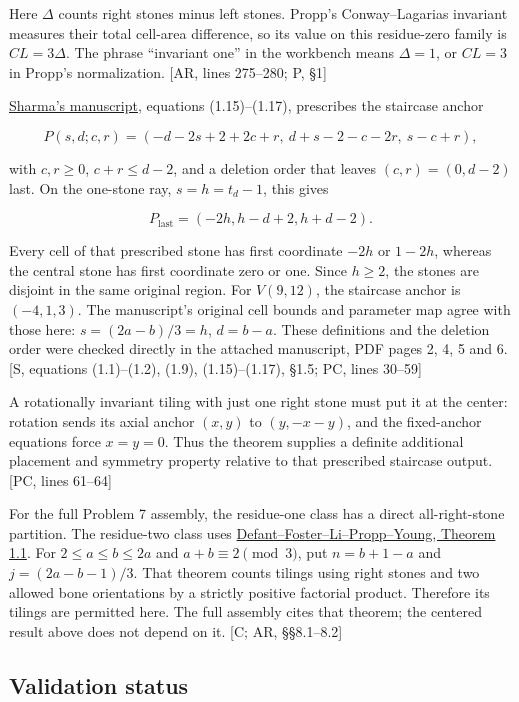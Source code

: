 \documentclass[
  11pt,
]{article}
\begin{document}
Here \(\Delta\) counts right stones minus left stones. Propp's
Conway--Lagarias invariant measures their total cell-area difference, so
its value on this residue-zero family is \(CL=3\Delta\). The phrase
``invariant one'' in the workbench means \(\Delta=1\), or \(CL=3\) in
Propp's normalization. {[}AR, lines 275--280; P, §1{]}

\href{https://mathdb.com/api/solution-artifacts/35a67ccb-6716-4906-99fe-54ea1784365b/media}{Sharma's
manuscript}, equations (1.15)--(1.17), prescribes the staircase anchor

\[
P(s,d;c,r)=(-d-2s+2+2c+r,\ d+s-2-c-2r,\ s-c+r),
\]

with \(c,r\ge0\), \(c+r\le d-2\), and a deletion order that leaves
\((c,r)=(0,d-2)\) last. On the one-stone ray, \(s=h=t_d-1\), this gives

\[
P_{\mathrm{last}}=(-2h,h-d+2,h+d-2).
\]

Every cell of that prescribed stone has first coordinate \(-2h\) or
\(1-2h\), whereas the central stone has first coordinate zero or one.
Since \(h\ge2\), the stones are disjoint in the same original region.
For \(V(9,12)\), the staircase anchor is \((-4,1,3)\). The manuscript's
original cell bounds and parameter map agree with those here:
\(s=(2a-b)/3=h\), \(d=b-a\). These definitions and the deletion order
were checked directly in the attached manuscript, PDF pages 2, 4, 5 and
6. {[}S, equations (1.1)--(1.2), (1.9), (1.15)--(1.17), §1.5; PC, lines
30--59{]}

A rotationally invariant tiling with just one right stone must put it at
the center: rotation sends its axial anchor \((x,y)\) to \((y,-x-y)\),
and the fixed-anchor equations force \(x=y=0\). Thus the theorem
supplies a definite additional placement and symmetry property relative
to that prescribed staircase output. {[}PC, lines 61--64{]}

For the full Problem 7 assembly, the residue-one class has a direct
all-right-stone partition. The residue-two class uses
\href{https://arxiv.org/html/2403.07663v1}{Defant--Foster--Li--Propp--Young,
Theorem 1.1}. For \(2\le a\le b\le2a\) and \(a+b\equiv2\pmod3\), put
\(n=b+1-a\) and \(j=(2a-b-1)/3\). That theorem counts tilings using
right stones and two allowed bone orientations by a strictly positive
factorial product. Therefore its tilings are permitted here. The full
assembly cites that theorem; the centered result above does not depend
on it. {[}C; AR, §§8.1--8.2{]}

\subsection{Validation status}\label{validation-status}
\end{document}
